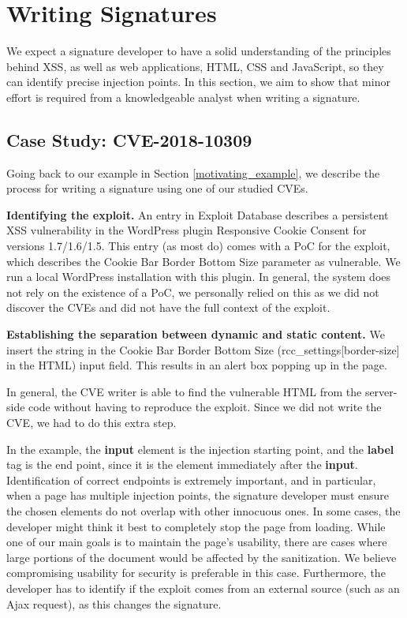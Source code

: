 \section{Writing Signatures} \label{signature_writing}

We expect a signature developer to have a solid understanding of the principles behind \ac{XSS}, as well as web applications, HTML, CSS and JavaScript, so they can identify precise injection points. In this section, we aim to show that minor effort is required from a knowledgeable analyst when writing a signature.


\subsection{Case Study: CVE-2018-10309} \label{case_study}
Going back to our example in Section \ref{motivating_example}, we describe the process for writing a signature using one of our studied CVEs.

\textbf{Identifying the exploit.} An entry in Exploit Database
\cite{studyCVE} describes a persistent \ac{XSS} vulnerability in the
WordPress plugin Responsive Cookie Consent for versions
1.7/1.6/1.5. This entry (as most do) comes with a \ac{PoC} for the
exploit, which describes the Cookie Bar Border Bottom Size parameter
as vulnerable. We run a local WordPress installation with this plugin. In general, the system does not rely on the existence of a \ac{PoC}, we personally relied on this as we did not discover the CVEs and did not have the full context of the exploit.

\textbf{Establishing the separation between dynamic and static content.} We insert the string  in the Cookie Bar Border Bottom Size (rcc\_settings[border-size] in the HTML) input field. This results in an alert box popping up in the page.

In general, the CVE writer is able to find the vulnerable HTML from the server-side code without having to reproduce the exploit. Since we did not write the CVE, we had to do this extra step.

In the example, the \textbf{input} element is the injection starting point, and the \textbf{label} tag is the end point, since it is the element immediately after the \textbf{input}. Identification of correct endpoints is extremely important, and in particular, when a page has multiple injection points, the signature developer must ensure the chosen elements do not overlap with other innocuous ones. In some cases, the developer might think it best to completely stop the page from loading. While one of our main goals is to maintain the page’s usability, there are cases where large portions of the document would be affected by the sanitization. We believe compromising usability for security is preferable in this case. Furthermore, the developer has to identify if the exploit comes from an external source (such as an Ajax request), as this changes the signature.

